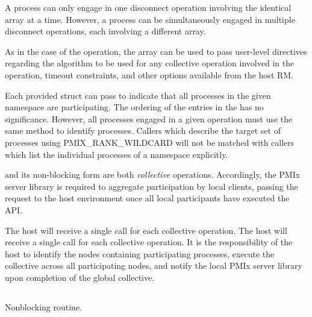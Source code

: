A process can only engage in one disconnect operation involving the identical  array at a time.
However, a process can be simultaneously engaged in multiple disconnect operations, each involving a different  array.

As in the case of the  operation, the  array can be used to pass user-level directives regarding the algorithm to be used for any collective operation involved in the operation, timeout constraints, and other options available from the host \ac{RM}.

Each provided  struct can pass  to indicate that all processes in the given namespace are participating.
The ordering of the entries in the  has no significance.  However, all processes engaged in a given
operation must use the same method to identify processes.  Callers which describe
the target set of processes using PMIX_RANK_WILDCARD will not be matched with
callers which list the individual processes of a namespace explicitly.

\adviceimplstart
{} and its non-blocking form are both \emph{collective} operations. Accordingly, the \ac{PMIx} server library is required to aggregate participation by local clients, passing the request to the host environment once all local participants have executed the \ac{API}.
\adviceimplend

\advicermstart
The host will receive a single call for each collective operation. The host will receive a single call for each collective operation. It is the responsibility of the host to identify the nodes containing participating processes, execute the collective across all participating nodes, and notify the local \ac{PMIx} server library upon completion of the global collective.

\advicermend


\subsection{}

\summary

Nonblocking  routine.

\format


